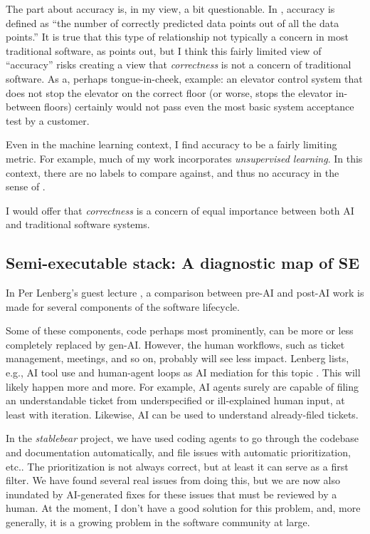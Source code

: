 \documentclass[a4paper,11pt]{article}
\begin{document}
The part about accuracy is, in my view, a bit questionable. In \cite{Habibullah2023Non}, accuracy is defined as ``the number of correctly predicted data points out of all the data points.'' It is true that this type of relationship not typically a concern in most traditional software, as \cite{Habibullah2023Non} points out, but I think this fairly limited view of ``accuracy'' risks creating a view that \emph{correctness} is not a concern of traditional software. As a, perhaps tongue-in-cheek, example: an elevator control system that does not stop the elevator on the correct floor (or worse, stops the elevator in-between floors) certainly would not pass even the most basic system acceptance test by a customer.

Even in the machine learning context, I find accuracy to be a fairly limiting metric. For example, much of my work incorporates \emph{unsupervised learning}. In this context, there are no labels to compare against, and thus no accuracy in the sense of \cite{Habibullah2023Non, frattini2026agentic}.

I would offer that \emph{correctness} is a concern of equal importance between both AI and traditional software systems.

\subsection{Semi-executable stack: A diagnostic map of SE}

In Per Lenberg's guest lecture \cite{lenberg2026importance}, a comparison between pre-AI and post-AI work is made for several components of the software lifecycle.

Some of these components, code perhaps most prominently, can be more or less completely replaced by gen-AI. However, the human workflows, such as ticket management, meetings, and so on, probably will see less impact. Lenberg lists, e.g., AI tool use and human-agent loops as AI mediation for this topic \cite{lenberg2026importance}. This will likely happen more and more. For example, AI agents surely are capable of filing an understandable ticket from underspecified or ill-explained human input, at least with iteration. Likewise, AI can be used to understand already-filed tickets.

In the \emph{stablebear} project, we have used coding agents to go through the codebase and documentation automatically, and file issues with automatic prioritization, etc.. The prioritization is not always correct, but at least it can serve as a first filter. We have found several real issues from doing this, but we are now also inundated by AI-generated fixes for these issues that must be reviewed by a human. At the moment, I don't have a good solution for this problem, and, more generally, it is a growing problem in the software community at large.
\end{document}
